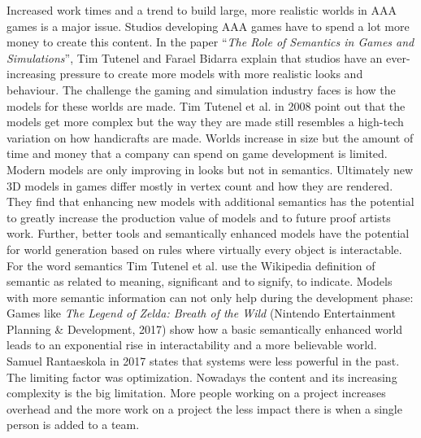 \documentclass[10pt,a4paper]{article}
\begin{document}
\begin{multicols}{2}
Increased work times and a trend to build large, more realistic worlds in AAA games is a major issue. Studios developing AAA games have to spend a lot more money to create this content. In the paper “\textit{The Role of Semantics in Games and Simulations}”, Tim Tutenel and Farael Bidarra explain that studios have an ever-increasing pressure to create more models with more realistic looks and behaviour. The challenge the gaming and simulation industry faces is how the models for these worlds are made. Tim Tutenel et al. in 2008 point out that the models get more complex but the way they are made still resembles a high-tech variation on how handicrafts are made\cite{Tutenel2008}. Worlds increase in size but the amount of time and money that a company can spend on game development is limited. Modern models are only improving in looks but not in semantics\cite{Tutenel2008}. Ultimately new 3D models in games differ mostly in vertex count and how they are rendered. They find that enhancing new models with additional semantics has the potential to greatly increase the production value of models and to future proof artists work. Further, better tools and semantically enhanced models have the potential for world generation based on rules where virtually every object is interactable. For the word semantics Tim Tutenel et al. use the Wikipedia definition of semantic as related to meaning, significant and to signify, to indicate\cite{Wikipediacontributors2019, Tutenel2008}. Models with more semantic information can not only help during the development phase: Games like \textit{The Legend of Zelda: Breath of the Wild} (Nintendo Entertainment Planning \& Development, 2017) show how a basic semantically enhanced world leads to an exponential rise in interactability and a more believable world. Samuel Rantaeskola in 2017 states that systems were less powerful in the past. The limiting factor was optimization. Nowadays the content and its increasing complexity is the big limitation\cite{Prinke2017}. More people working on a project increases overhead and the more work on a project the less impact there is when a single person is added to a team.

\end{multicols}
\end{document}
